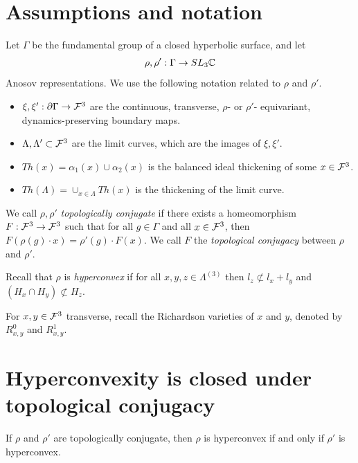 \section{Assumptions and notation}
Let $\Gamma$ be the fundamental group of a closed hyperbolic surface, and let
\begin{align}
    \rho, \rho' : \Gamma \rightarrow SL_3\mathbb{C}
\end{align} 
Anosov representations.
We use the following notation related to $\rho$ and $\rho'$.
\begin{itemize}
    \item $\xi, \xi' : \partial \Gamma \rightarrow \mathcal{F}^3 $ are the continuous, transverse, 
    $\rho$- or $\rho'$- equivariant, dynamics-preserving boundary maps. 
    \item $\Lambda, \Lambda' \subset \mathcal{F}^3$ are the limit curves, 
    which are the images of $\xi, \xi'$.
    \item $Th(x) = \alpha_1(x) \cup \alpha_2(x)$ is the balanced ideal thickening of some $x \in \mathcal{F}^3$.
    \item $Th(\Lambda) = \cup_{x \in \Lambda}Th(x)$ is the thickening of the limit curve.     
\end{itemize}

We call $\rho, \rho'$ \emph{topologically conjugate} if there exists a homeomorphism 
$F:\mathcal{F}^3 \rightarrow \mathcal{F}^3$ such that for all $g \in \Gamma$ and all $x \in \mathcal{F}^3$, 
then $F(\rho(g) \cdot x) = \rho'(g) \cdot F(x)$.
We call $F$ the \emph{topological conjugacy} between $\rho$ and $\rho'$.

Recall that $\rho$ is \emph{hyperconvex} if for all $x,y,z \in \Lambda^{(3)}$
then $l_z \not \subset l_x + l_y$ and $(H_x \cap H_y) \not \subset H_z$.

For $x,y \in \mathcal{F}^3$ transverse, recall the Richardson varieties of $x$ and $y$, 
denoted by $R^0_{x,y}$ and $R^1_{x,y}$.

\section{Hyperconvexity is closed under topological conjugacy}

\begin{theorem}\label{thm:hyperconvex-conjugate}
    If $\rho$ and $\rho'$ are topologically conjugate, 
    then $\rho$ is hyperconvex if and only if $\rho'$ is hyperconvex.
\end{theorem}


